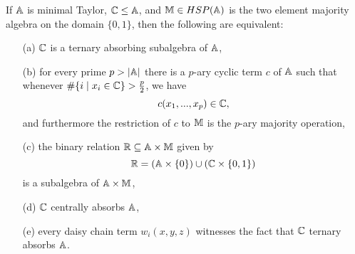 \documentclass[letterpaper,11pt]{article}
\begin{document}
\begin{thm} If $\mathbb{A}$ is minimal Taylor, $\mathbb{C} \le \mathbb{A}$, and $\mathbb{M} \in HSP(\mathbb{A})$ is the two element majority algebra on the domain $\{0,1\}$, then the following are equivalent:
\begin{itemize}
\item[(a)] $\mathbb{C}$ is a ternary absorbing subalgebra of $\mathbb{A}$,
\item[(b)] for every prime $p > |\mathbb{A}|$ there is a $p$-ary cyclic term $c$ of $\mathbb{A}$ such that whenever $\#\{i \mid x_i \in \mathbb{C}\} > \frac{p}{2}$, we have
\[
c(x_1, ..., x_p) \in \mathbb{C},
\]
and furthermore the restriction of $c$ to $\mathbb{M}$ is the $p$-ary majority operation,
\item[(c)] the binary relation $\mathbb{R} \subseteq \mathbb{A} \times \mathbb{M}$ given by
\[
\mathbb{R} = (\mathbb{A} \times \{0\}) \cup (\mathbb{C} \times \{0,1\})
\]
is a subalgebra of $\mathbb{A} \times \mathbb{M}$,
\item[(d)] $\mathbb{C}$ centrally absorbs $\mathbb{A}$,
\item[(e)] every daisy chain term $w_i(x,y,z)$ witnesses the fact that $\mathbb{C}$ ternary absorbs $\mathbb{A}$.
\end{itemize}
\end{thm}
\end{document}

